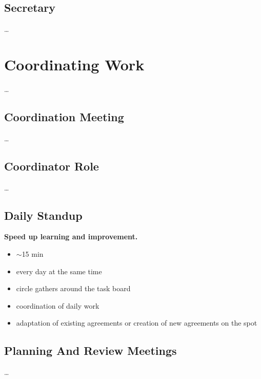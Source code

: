 \section{Secretary}
\label{secretary}

{\ldots}

\chapter{Coordinating Work}
\label{coordinatingwork}

{\ldots}

\section{Coordination Meeting}
\label{coordinationmeeting}

{\ldots}

\section{Coordinator Role}
\label{coordinatorrole}

{\ldots}

\section{Daily Standup}
\label{dailystandup}

\textbf{Speed up learning and improvement.}

\begin{itemize}
\item \ensuremath{\sim}15 min

\item every day at the same time

\item circle gathers around the task board

\item coordination of daily work

\item adaptation of existing agreements or creation of new agreements on the spot

\end{itemize}

\section{Planning And Review Meetings}
\label{planningandreviewmeetings}

{\ldots}

